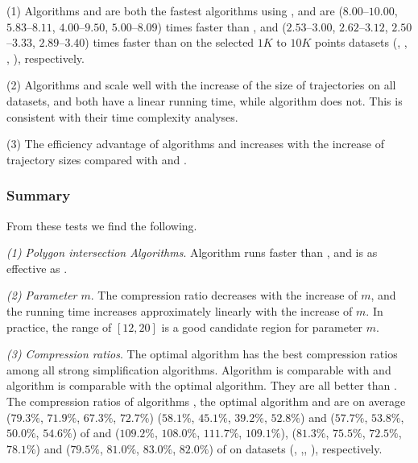 
\ni(1) Algorithms \cist and \cista are both the fastest \lsa algorithms using \sed,
and are {($8.00$--$10.00$, $5.83$--$8.11$, $4.00$--$9.50$, $5.00$--$8.09$) times faster than \dps,
	and {($2.53$--$3.00$, $2.62$--$3.12$, $2.50$--$3.33$, $2.89$--$3.40$)}} times faster than \squishe on the selected $1K$ to $10K$ points datasets (\sercar,
\geolife, \mopsi, \pricar), respectively.

\ni(2) Algorithms \cist and \cista scale well with the increase of the size of trajectories on all datasets,
and both have a linear running time, while algorithm \dps does not.
This is consistent with their time complexity analyses.

\ni(3) The efficiency advantage of algorithms \cist and \cista increases with the increase of trajectory sizes compared with \dps and \squishe.


\subsubsection{Summary}
From these tests we find the following.

\sstab \emph{(1) Polygon intersection Algorithms}. Algorithm \rpia runs faster than \cpia, and is as effective as \cpia.

\sstab\emph{(2) Parameter $m$}. The compression ratio decreases with the increase of $m$, and the running time increases approximately linearly with the increase of $m$. In practice, the range of $[12, 20]$ is a good candidate region for parameter $m$.

\sstab\emph{(3) Compression ratios}. The optimal algorithm has the best compression ratios among all strong simplification algorithms. Algorithm \cist is comparable with \dps and algorithm \cista is comparable with the optimal algorithm.
They are all better than \squishe.
The compression ratios of algorithms \cist, the optimal algorithm and \cista are on average
($79.3\%$, $71.9\%$, $67.3\%$, $72.7\%$)
{($58.1\%$, $45.1\%$, $39.2\%$, $52.8\%$)} and ($57.7\%$, $53.8\%$, $50.0\%$, $54.6\%$) of \squishe
and ($109.2\%$, $108.0\%$, $111.7\%$, $109.1\%$), {($81.3\%$, $75.5\%$, $72.5\%$, $78.1\%$)} and ($79.5\%$, $81.0\%$, $83.0\%$, $82.0\%$) of \dps on {datasets} (\sercar, \geolife,\mopsi, \pricar), respectively.


